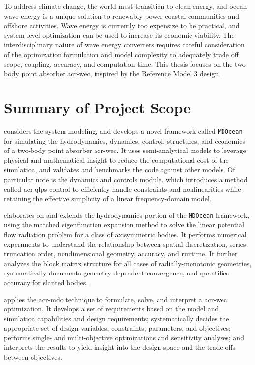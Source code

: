 To address climate change, the world must transition to clean energy,
and ocean wave energy is a unique solution to renewably power coastal communities and offshore activities.
Wave energy is currently too expensize to be practical, and system-level optimization can be used to increase its economic viability.
The interdisciplinary nature of wave energy converters requires careful consideration of the optimization formulation and model complexity
to adequately trade off scope, coupling, accuracy, and computation time.
This thesis focuses on the two-body point absorber \gls{acr-wec}, inspired by the Reference Model 3 design \cite{RM3}.

\section{Summary of Project Scope}
 considers the system modeling, and develops a novel framework called \texttt{MDOcean} for simulating the hydrodynamics, dynamics, control, structures, and economics of a two-body point absorber \gls{acr-wec}.
It uses semi-analytical models to leverage physical and mathematical insight to reduce the computational cost of the simulation,
and validates and benchmarks the code against other models.
Of particular note is the dynamics and controls module, which introduces a method called \gls{acr-qlps} control to efficiently handle constraints and nonlinearities while retaining the effective simplicity of a linear frequency-domain model. 

 elaborates on and extends the hydrodynamics portion of the \texttt{MDOcean} framework, using the matched eigenfunction expansion method to solve the linear potential flow radiation problem for a class of axisymmetric bodies.
It performs numerical experiments to understand the relationship between spatial discretization, series truncation order, nondimensional geometry, accuracy, and runtime.
It further analyzes the block matrix structure for all cases of radially-monotonic geometries,
systematically documents geometry-dependent convergence,
and quantifies accuracy for slanted bodies.

 applies the \gls{acr-mdo} technique to formulate, solve, and interpret a \gls{acr-wec} optimization.
It develops a set of requirements based on the model and simulation capabilities and design requirements; 
systematically decides the appropriate set of design variables, constraints, parameters, and objectives;
performs single- and multi-objective optimizations and sensitivity analyses;
and interprets the results to yield insight into the design space and the trade-offs between objectives.

